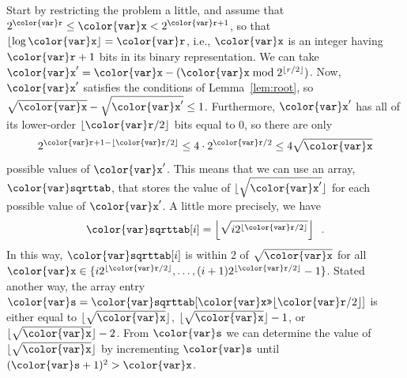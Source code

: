 \documentclass[10pt]{book}
\theoremstyle{plain}
\newcommand{\lemref}[1]{Lemma~\ref{lem:#1}}
\theoremstyle{definition}
\begin{document}
{Start by restricting the problem a little, and assume that $2^{\ensuremath{\mathtt{{\color{var}r}}}} \le
\ensuremath{\mathtt{{\color{var}x}}} < 2^{\ensuremath{\mathtt{{\color{var}r}}}+1}$, so that $\lfloor\log \ensuremath{\mathtt{{\color{var}x}}}\rfloor=\ensuremath{\mathtt{{\color{var}r}}}$, i.e., \ensuremath{\mathtt{{\color{var}x}}} is an
integer having $\ensuremath{\mathtt{{\color{var}r}}}+1$ bits in its binary representation.  We can take
$\ensuremath{\mathtt{{\color{var}x}'}}=\ensuremath{\mathtt{{\color{var}x}}} - (\ensuremath{\mathtt{{\color{var}x}}}\bmod 2^{\lfloor r/2\rfloor})$.  Now, \ensuremath{\mathtt{{\color{var}x}'}} satisfies
the conditions of \lemref{root}, so $\sqrt{\ensuremath{\mathtt{{\color{var}x}}}}-\sqrt{\ensuremath{\mathtt{{\color{var}x}'}}} \le 1$.
Furthermore, \ensuremath{\mathtt{{\color{var}x}'}} has all of its lower-order $\lfloor \ensuremath{\mathtt{{\color{var}r}}}/2\rfloor$ bits
equal to 0, so there are only
\[
  2^{\ensuremath{\mathtt{{\color{var}r}}}+1-\lfloor \ensuremath{\mathtt{{\color{var}r}}}/2\rfloor} \le 4\cdot2^{\ensuremath{\mathtt{{\color{var}r}}}/2} \le 4\sqrt{\ensuremath{\mathtt{{\color{var}x}}}}
\]
possible values of \ensuremath{\mathtt{{\color{var}x}'}}.  This means that we can use an array, \ensuremath{\mathtt{{\color{var}sqrttab}}},
that stores the value of $\lfloor\sqrt{\ensuremath{\mathtt{{\color{var}x}'}}}\rfloor$ for each possible
value of \ensuremath{\mathtt{{\color{var}x}'}}.  A little more precisely, we have
\[
   \ensuremath{\mathtt{{\color{var}sqrttab}}}[i] 
    = \left\lfloor
       \sqrt{i 2^{\lfloor \ensuremath{\mathtt{{\color{var}r}}}/2\rfloor}}
      \right\rfloor \enspace .
\]
In this way, $\ensuremath{\mathtt{{\color{var}sqrttab}}}[i]$ is within 2 of $\sqrt{\ensuremath{\mathtt{{\color{var}x}}}}$ for all
$\ensuremath{\mathtt{{\color{var}x}}}\in\{i2^{\lfloor \ensuremath{\mathtt{{\color{var}r}}}/2\rfloor},\ldots,(i+1)2^{\lfloor \ensuremath{\mathtt{{\color{var}r}}}/2\rfloor}-1\}$.
Stated another way, the array entry 
$\ensuremath{\mathtt{{\color{var}s}}}=\ensuremath{\mathtt{{\color{var}sqrttab}}}[\ensuremath{\mathtt{{\color{var}x}}}\ensuremath{\mathtt{\text{\ttfamily >>}}}\lfloor \ensuremath{\mathtt{{\color{var}r}}}/2\rfloor]$ is either equal to
$\lfloor\sqrt{\ensuremath{\mathtt{{\color{var}x}}}}\rfloor$,
$\lfloor\sqrt{\ensuremath{\mathtt{{\color{var}x}}}}\rfloor-1$, or
$\lfloor\sqrt{\ensuremath{\mathtt{{\color{var}x}}}}\rfloor-2$.  From \ensuremath{\mathtt{{\color{var}s}}} we can determine the value
of $\lfloor\sqrt{\ensuremath{\mathtt{{\color{var}x}}}}\rfloor$ by
incrementing \ensuremath{\mathtt{{\color{var}s}}} until 
$(\ensuremath{\mathtt{{\color{var}s}}}+1)^2 > \ensuremath{\mathtt{{\color{var}x}}}$.
} %
\end{document}
